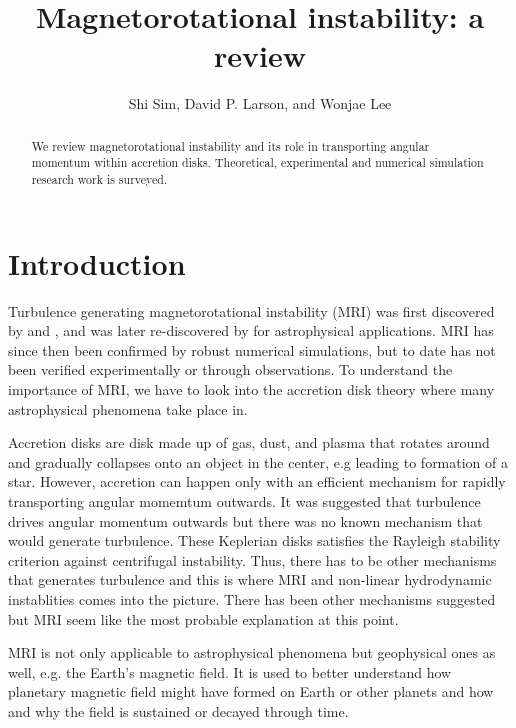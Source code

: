 \documentclass{jfm}
\title[Magnetorotational instability]{Magnetorotational instability: a review}
\author[S. Sim, D.~P. Larson, and W. Lee]{Shi Sim, David P. Larson, 
    and Wonjae Lee}
\affiliation{University of California, San Diego}
\begin{document}
\maketitle


\begin{abstract}
We review magnetorotational instability and its role in transporting angular 
momentum within accretion disks. Theoretical, experimental and numerical simulation
research work is surveyed.
\end{abstract}


\section{Introduction}
\label{sec:intro}

Turbulence generating magnetorotational instability (MRI) was first discovered 
by \cite{Velikhov1959} and \cite{Chandrasekhar1960}, and was later re-discovered by 
\cite{Balbus1998} for astrophysical applications. MRI has since then 
been confirmed by robust numerical simulations, but to date has not been 
verified experimentally or through observations. To understand the importance 
of MRI, we have to look into the accretion disk theory where many astrophysical phenomena take place in.

Accretion disks are disk made up of gas, dust, and plasma that rotates around 
and gradually collapses onto an object in the center, e.g leading to formation
of a star. However, accretion can happen only with an efficient mechanism for 
rapidly transporting angular momemtum outwards. It was suggested that 
turbulence drives angular momentum outwards but there was no known mechanism 
that would generate turbulence. These Keplerian disks satisfies the Rayleigh 
stability criterion \citep[see][]{Rayleigh1916} against centrifugal instability.
Thus, there has to be other mechanisms that generates turbulence and this is where 
MRI and non-linear hydrodynamic instablities comes into the picture. There has
been other mechanisms suggested but MRI seem like the most probable explanation
at this point.

MRI is not only applicable to astrophysical phenomena but geophysical ones as 
well, e.g. the Earth's magnetic field. It is used to better understand how planetary
magnetic field might  have formed on Earth or other planets and how and why the
field is sustained or decayed through time.
\end{document}
